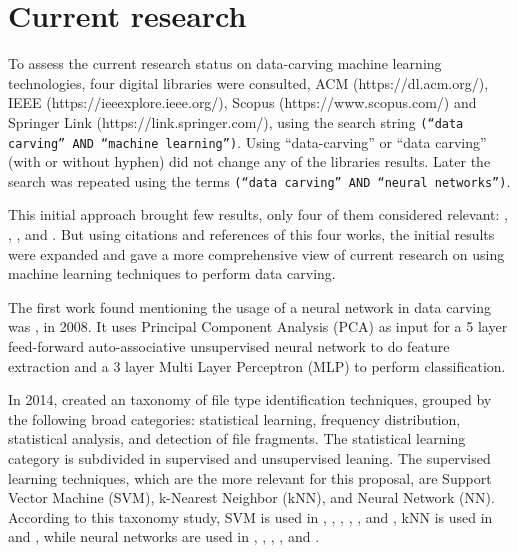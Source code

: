 \section{Current research}
To assess the current research status on data-carving machine learning technologies, four digital libraries were consulted, ACM (https://dl.acm.org/), IEEE (https://ieeexplore.ieee.org/), Scopus (https://www.scopus.com/) and Springer Link (https://link.springer.com/), using the search string 
{\texttt{(``data carving'' AND ``machine learning'')}}. Using ``data-carving'' or ``data carving'' (with or without hyphen) did not change any of the libraries results. Later the search was repeated using the terms {\texttt{(``data carving'' AND ``neural networks'')}}.

This initial approach brought few results, only four of them considered relevant: \cite{alamri_taxonomy_2014}, 
\cite{ali_review_2018}, \cite{sportiello_context-based_2012}, and \cite{beebe_sceadan:_2013}. But using citations and references of this four works, the initial results were expanded and gave a more comprehensive view of current research on using machine learning techniques to perform data carving.

The first work found mentioning the usage of a neural network in data carving was \cite{amirani_new_2008}, in 2008. It uses Principal Component Analysis (PCA) as input for a 5 layer feed-forward auto-associative unsupervised neural network to do feature extraction and a 3 layer Multi Layer Perceptron (MLP) to perform classification.

In 2014, \cite{alamri_taxonomy_2014} created an taxonomy of file type identification techniques, grouped by the following broad categories: statistical learning, frequency distribution, statistical analysis, and detection of file fragments. The statistical learning category is subdivided in supervised and unsupervised leaning. The supervised learning techniques, which are the more relevant for this proposal, are Support Vector Machine (SVM), k-Nearest Neighbor (kNN), and Neural Network (NN). According to this taxonomy study, SVM is used in \cite{ahmed_fast_2011}, \cite{amirani_feature-based_2013}, \cite{beebe_sceadan:_2013}, \cite{fitzgerald_using_2012}, \cite{gopal_statistical_2011}, and \cite{sportiello_context-based_2012}, kNN is used in \cite{ahmed_fast_2011} and \cite{gopal_statistical_2011}, while neural networks are used in \cite{ahmed_fast_2011}, \cite{ahmed_content-based_2010}, \cite{amirani_new_2008}, \cite{amirani_feature-based_2013}, and \cite{penrose_approaches_2013}.

